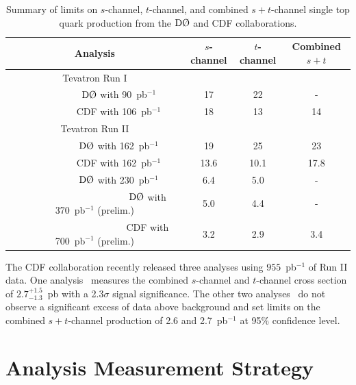\vspace{0.2in}
\begin{table}[!h!tbp]
\begin{center}
\caption{Summary of limits on $s$-channel, $t$-channel, and combined $s+t$-channel single top quark production from the $\dzero$ and CDF collaborations.}
\label{previouslimits}
\begin{tabular}{c|ccc}
Analysis									&	$s$-channel & $t$-channel & Combined $s+t$ \\
\hline
Tevatron Run I							&		&		&		\\
\hline
~~~~~~~~~~$\dzero$ with 90~pb$^{-1}$		&	17	&	22	&	-	\\
~~~~~~~~~~CDF with 106~pb$^{-1}$		&	18	&	13	&	14	\\
\hline
Tevatron Run II							&		&		&		\\
\hline
~~~~~~~~~~$\dzero$ with 162~pb$^{-1}$	&	19	&	25	&	23	\\
~~~~~~~~~~CDF with 162~pb$^{-1}$		&	13.6	&	10.1	&	17.8	\\
~~~~~~~~~~$\dzero$ with 230~pb$^{-1}$	&	6.4	&	5.0	&	-	\\
~~~~~~~~~~~~~~~~~~~~~~$\dzero$ with 370~pb$^{-1}$ (prelim.)	&	5.0	&	4.4	&	-	\\
~~~~~~~~~~~~~~~~~~~~~~CDF with 700~pb$^{-1}$ (prelim.)		&	3.2	&	2.9	&	3.4	\\
\end{tabular}
\vspace{-0.1in}
\end{center}
\end{table}

The CDF collaboration recently released three analyses using $955$~pb$^{-1}$ of Run II data. One analysis~\cite{run2-cdf-me-955} measures the combined $s$-channel and $t$-channel cross section of $2.7^{+1.5}_{-1.3}$~pb with a 2.3$\sigma$ signal significance. The other two analyses~\cite{run2-cdf-nn-955,run2-cdf-lhood-955} do not observe a significant excess of data above background and set limits on the combined $s+t$-channel production of 2.6 and 2.7~pb$^{-1}$ at 95$\%$ confidence level.

\section{Analysis Measurement Strategy}
\label{strategy}

